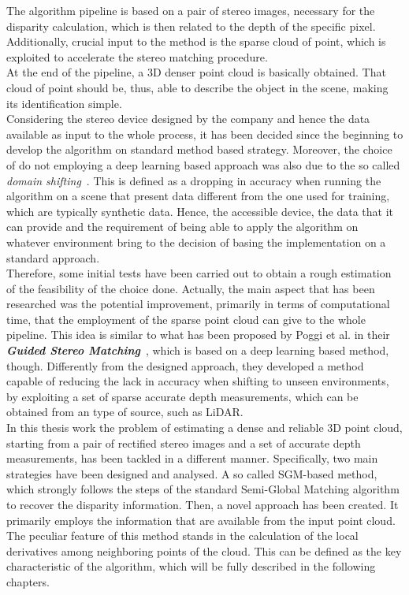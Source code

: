 The algorithm pipeline is based on a pair of stereo images,  necessary for the disparity calculation, which is then related to the depth of the specific pixel.
Additionally, crucial input to the method is the sparse cloud of point, which is exploited to accelerate the stereo matching procedure.\\
At the end of the pipeline, a 3D denser point cloud is basically obtained.
That cloud of point should be, thus, able to describe the object in the scene, making its identification simple. \\
Considering the stereo device designed by the company and hence the data available as input to the whole process, it has been decided since the beginning to develop the algorithm on standard method based strategy. 
Moreover, the choice of do not employing a deep learning based approach was also due to the so called \textit{domain shifting}~\cite{Poggi2019}.
This is defined as a dropping in accuracy when running the algorithm on a scene that present data different from the one used for training, which are typically synthetic data. 
Hence, the accessible device, the data that it can provide and the requirement of being able to apply the algorithm on whatever environment bring to the decision of basing the implementation on a standard approach.\\
Therefore, some initial tests have been carried out to obtain a rough estimation of the feasibility of the choice done.
Actually, the main aspect that has been researched was the potential improvement, primarily in terms of computational time, that the employment of the sparse point cloud can give to the whole pipeline.
This idea is similar to what has been proposed by Poggi et al. in their \textbf{\textit{Guided Stereo Matching}}~\cite{Poggi2019}, which is based on a deep learning based method, though.
Differently from the designed approach, they developed a method capable of reducing the lack in accuracy when shifting to unseen environments, by exploiting a set of sparse accurate depth measurements, which can be obtained from an type of source, such as LiDAR.\\
In this thesis work the problem of estimating a dense and reliable 3D point cloud, starting from a pair of rectified stereo images and a set of accurate depth measurements, has been tackled in a different manner.
Specifically, two main strategies have been designed and analysed.
A so called SGM-based method, which strongly follows the steps of the standard Semi-Global Matching algorithm to recover the disparity information.
Then, a novel approach has been created.
It primarily employs the information that are available from the input point cloud.
The peculiar feature of this method stands in the calculation of the local derivatives among neighboring points of the cloud.
This can be defined as the key characteristic of the algorithm, which will be fully described in the following chapters.

